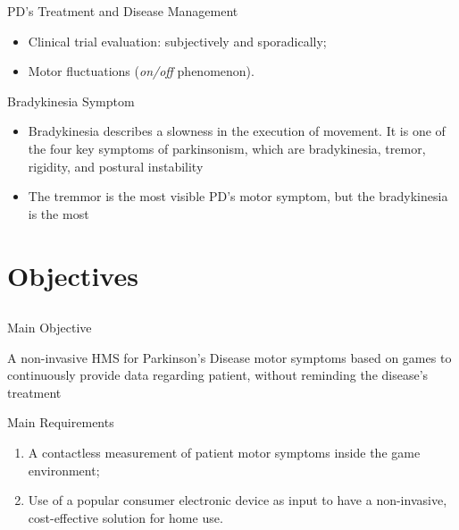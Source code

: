 \documentclass{beamer}
\begin{document}
\begin{frame}{PD's Treatment and Disease Management} 
    \begin{block}{}
      \begin{itemize}
					\item Clinical trial evaluation: subjectively and sporadically;
					\item Motor fluctuations (\textit{on/off} phenomenon).
     \end{itemize}
  \end{block}
\end{frame}



\begin{frame}{Bradykinesia Symptom}
  \begin{block}{}
      \begin{itemize}
				\item Bradykinesia describes a slowness in the execution of movement. It is one of the four key symptoms of parkinsonism, which are bradykinesia, tremor, rigidity, and postural instability
				\item The tremmor is the most visible PD's motor symptom, but the bradykinesia is the most
	\end{itemize}
  \end{block}
\end{frame}
  


\section{Objectives}
\subsection{}
\begin{frame}{Main Objective}
		 \begin{block}{}
				A non-invasive HMS for Parkinson's Disease motor symptoms based on games to continuously provide data regarding patient, without reminding the disease's treatment
		 \end{block}
     \begin{block}{}
     \begin{center}		
		
      \end{center}
    \end{block}
\end{frame}

\begin{frame}{Main Requirements}
    \begin{block}{}
		    \begin{enumerate}[<+->]
            \item A contactless measurement of patient motor symptoms inside the game environment;
						\item Use of a popular consumer electronic device as input to have a non-invasive, cost-effective solution for home use.
        \end{enumerate}
    \end{block}
\end{frame}
\end{document}
